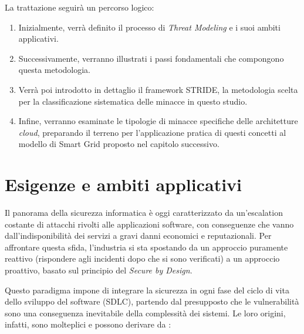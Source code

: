 La trattazione seguirà un percorso logico:
\begin{enumerate}
    \item Inizialmente, verrà definito il processo di \textit{Threat Modeling} e i suoi ambiti applicativi.
    \item Successivamente, verranno illustrati i passi fondamentali che compongono questa metodologia.
    \item Verrà poi introdotto in dettaglio il framework STRIDE, la metodologia scelta per la classificazione sistematica delle minacce in questo studio.
    \item Infine, verranno esaminate le tipologie di minacce specifiche delle architetture \textit{cloud}, preparando il terreno per l'applicazione pratica di questi concetti al modello di Smart Grid proposto nel capitolo successivo.
\end{enumerate}

\section{Esigenze e ambiti applicativi}




Il panorama della sicurezza informatica è oggi caratterizzato da un'escalation costante di attacchi rivolti alle applicazioni software, con conseguenze che vanno dall'indisponibilità dei servizi a gravi danni economici e reputazionali. Per affrontare questa sfida, l'industria si sta spostando da un approccio puramente reattivo (rispondere agli incidenti dopo che si sono verificati) a un approccio proattivo, basato sul principio del \textit{Secure by Design}.


Questo paradigma impone di integrare la sicurezza in ogni fase del ciclo di vita dello sviluppo del software (SDLC), partendo dal presupposto che le vulnerabilità sono una conseguenza inevitabile della complessità dei sistemi. Le loro origini, infatti, sono molteplici e possono derivare da \cite{agid}: 

